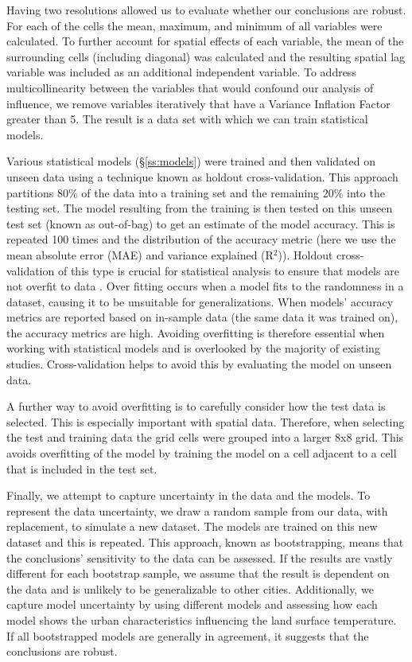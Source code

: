 \documentclass[final,3p,times,twocolumn,sort&compress]{elsarticle}
\begin{document}
Having two resolutions allowed us to evaluate whether our conclusions are robust.
For each of the cells the mean, maximum, and minimum of all variables were calculated. 
To further account for spatial effects of each variable, the mean of the surrounding cells (including diagonal) was calculated and the resulting spatial lag variable was included as an additional independent variable. 
To address multicollinearity between the variables that would confound our analysis of influence, we remove variables iteratively that have a Variance Inflation Factor greater than 5.
The result is a data set with which we can train statistical models.

Various statistical models (\S \ref{ss:models}) were trained and then validated on unseen data using a technique known as holdout cross-validation. 
This approach partitions 80\% of the data into a training set and the remaining 20\% into the testing set.
The model resulting from the training is then tested on this unseen test set (known as out-of-bag) to get an estimate of the model accuracy.
This is repeated 100 times and the distribution of the accuracy metric (here we use the mean absolute error (MAE) and variance explained (R$^2$)).
Holdout cross-validation of this type is crucial for statistical analysis to ensure that models are not overfit to data \cite{Geron2017-ek}.
Over fitting occurs when a model fits to the randomness in a dataset, causing it to be unsuitable for generalizations. 
When models' accuracy metrics are reported based on in-sample data (the same data it was trained on), the accuracy metrics are high.
Avoiding overfitting is therefore essential when working with statistical models and is overlooked by the majority of existing studies.
Cross-validation helps to avoid this by evaluating the model on unseen data.

A further way to avoid overfitting is to carefully consider how the test data is selected.
This is especially important with spatial data.
Therefore, when selecting the test and training data the grid cells were grouped into a larger 8x8 grid.
This avoids overfitting of the model by training the model on a cell adjacent to a cell that is included in the test set.

Finally, we attempt to capture uncertainty in the data and the models. 
To represent the data uncertainty, we draw a random sample from our data, with replacement, to simulate a new dataset.
The models are trained on this new dataset and this is repeated.
This approach, known as bootstrapping, means that the conclusions' sensitivity to the data can be assessed.
If the results are vastly different for each bootstrap sample, we assume that the result is dependent on the data and is unlikely to be generalizable to other cities.
Additionally, we capture model uncertainty by using different models and assessing how each model shows the urban characteristics influencing the land surface temperature.
If all bootstrapped models are generally in agreement, it suggests that the conclusions are robust.
\end{document}
